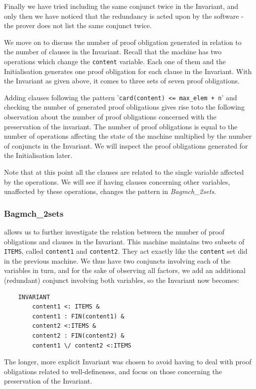 \documentclass[12pt,journal,duplex]{IEEEtran}
\begin{document}
	Finally we have tried including the same conjunct twice in the Invariant, and only then we have noticed that the redundancy is acted upon by the software - the prover does not list the same conjunct twice.

	We move on to discuss the number of proof obligation generated in relation to the number of clauses in the Invariant. Recall that the machine has two operations which change the \texttt{content} variable. Each one of them and the Initialisation generates one proof obligation for each clause in the Invariant. With the Invariant as given above, it comes to three sets of seven proof obligations.

	Adding clauses following the pattern '\texttt{card(content) <= max\_elem + n}' and checking the number of generated proof obligations gives rise toto the following observation about the number of proof obligations concerned with the preservation of the invariant. The number of proof obligations is equal to the number of operations affecting the state of the machine multiplied by the number of conjuncts in the Invariant. We will inspect the proof obligations generated for the Initialisation later.

	Note that at this point all the clauses are related to the single variable affected by the operations. We will see if having clauses concerning other variables, unaffected by these operations, changes the pattern in \emph{Bagmch\_2sets}.

	\subsubsection{Bagmch\_2sets} allows us to further investigate the relation between the number of proof obligations and clauses in the Invariant. This machine maintains two subsets of \texttt{ITEMS}, called \texttt{content1} and \texttt{content2}. They act exactly like the \texttt{content} set did in the previous machine. We thus have two conjuncts involving each of the variables in turn, and for the sake of observing all factors, we add an additional (redundant) conjunct involving both variables, so the Invariant now becomes:

	\begin{lstlisting}
	INVARIANT
		content1 <: ITEMS &
		content1 : FIN(content1) &
		content2 <:ITEMS &
		content2 : FIN(content2) &
		content1 \/ content2 <:ITEMS
	\end{lstlisting}
	The longer, more explicit Invariant was chosen to avoid having to deal with proof obligations related to well-defineness, and focus on those concerning the preservation of the Invariant.
\end{document}
